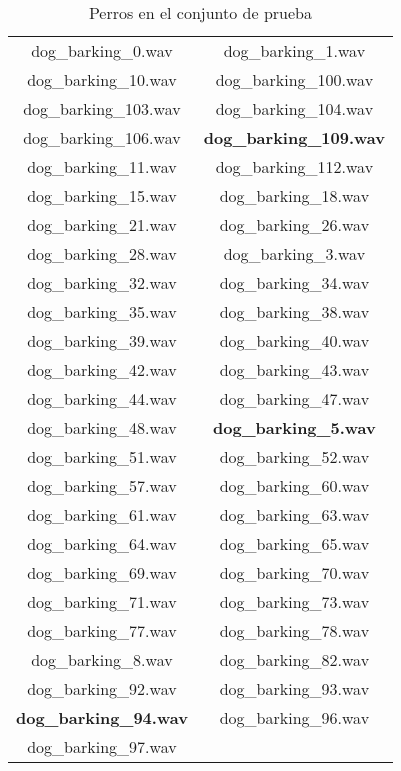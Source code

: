 \documentclass[twocolumn,10pt]{asme2ej}
\begin{document}
\begin{table}[h]
\begin{tabular}{cc}
dog\_barking\_0.wav & dog\_barking\_1.wav \\
dog\_barking\_10.wav & dog\_barking\_100.wav \\
dog\_barking\_103.wav & dog\_barking\_104.wav \\
dog\_barking\_106.wav & \textbf{dog\_barking\_109.wav} \\
dog\_barking\_11.wav & dog\_barking\_112.wav \\
dog\_barking\_15.wav & dog\_barking\_18.wav \\
dog\_barking\_21.wav & dog\_barking\_26.wav \\
dog\_barking\_28.wav & dog\_barking\_3.wav \\
dog\_barking\_32.wav & dog\_barking\_34.wav \\
dog\_barking\_35.wav & dog\_barking\_38.wav \\
dog\_barking\_39.wav & dog\_barking\_40.wav \\
dog\_barking\_42.wav & dog\_barking\_43.wav \\
dog\_barking\_44.wav & dog\_barking\_47.wav \\
dog\_barking\_48.wav& \textbf{dog\_barking\_5.wav}\\
dog\_barking\_51.wav& dog\_barking\_52.wav\\
dog\_barking\_57.wav& dog\_barking\_60.wav\\
dog\_barking\_61.wav& dog\_barking\_63.wav\\
dog\_barking\_64.wav& dog\_barking\_65.wav\\
dog\_barking\_69.wav& dog\_barking\_70.wav\\
dog\_barking\_71.wav& dog\_barking\_73.wav\\
dog\_barking\_77.wav& dog\_barking\_78.wav\\
dog\_barking\_8.wav& dog\_barking\_82.wav\\
dog\_barking\_92.wav& dog\_barking\_93.wav\\
\textbf{dog\_barking\_94.wav}& dog\_barking\_96.wav\\
dog\_barking\_97.wav
\end{tabular}
\label{tbl:conjunto_prueba_perro}
\caption{Perros en el conjunto de prueba}
\end{table}
\end{document}
